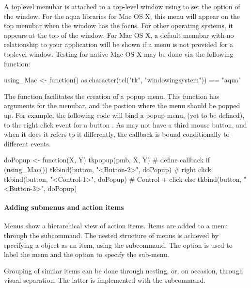 A toplevel menubar is attached to a top-level window using 
to set the  option of the window. For the aqua \TK\/
libraries for Mac OS X, this menu will appear on the top menubar when
the window has the focus. For other operating systems, it appears at
the top of the window. For Mac OS X, a default menubar with no
relationship to your application will be shown if a menu is not
provided for a toplevel window. Testing for native Mac OS X may be done via
the following function:
\begin{Schunk}
\begin{Sinput}
 using_Mac <- function()  
   as.character(tcl("tk", "windowingsystem")) == "aqua"
\end{Sinput}
\end{Schunk}

The  function facilitates the creation of a popup
menu.  This function has arguments for the menubar, and the postion
where the menu should be popped up. For example, the following code
will bind a popup menu,  (yet to be defined), to the right click event for a
button . As \OSX\/ may not have a third mouse button, and when
it does it refers to it differently, the callback is bound
conditionally to different events.


\begin{Schunk}
\begin{Sinput}
 doPopup <- function(X, Y) tkpopup(pmb, X, Y) # define callback
 if (using_Mac()) {
   tkbind(button, "<Button-2>", doPopup)      # right click
   tkbind(button, "<Control-1>", doPopup)     # Control + click
 } else {
   tkbind(button, "<Button-3>", doPopup)
 }
\end{Sinput}
\end{Schunk}


\paragraph{Adding submenus and action items}
Menus show a hierarchical view of action items. Items are added to a
menu through the  subcommand.  The nested
structure of menus is achieved by specifying a  object as
an item, using the  subcommand. The
option  is used to label the menu and the 
option to specify the sub-menu.

Grouping of similar items can be done through nesting, or, on occasion,
through visual separation. The latter is implemented with the  subcommand.


